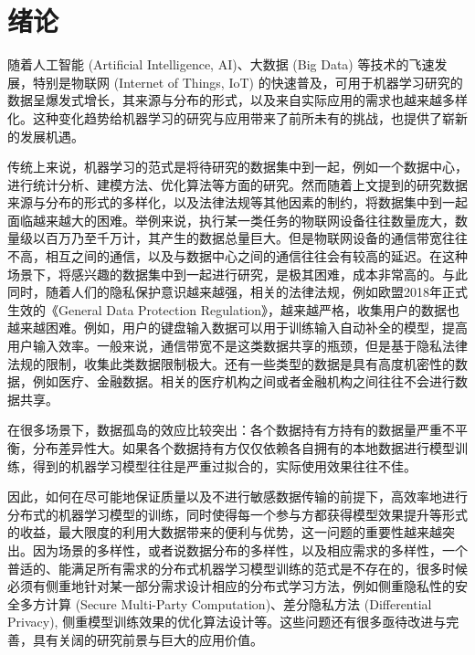 \section{绪论}
\label{sec:chap1-introduction}


随着人工智能 (Artificial Intelligence, AI)、大数据 (Big Data) 等技术的飞速发展，特别是物联网 (Internet of Things, IoT) 的快速普及，可用于机器学习研究的数据呈爆发式增长，其来源与分布的形式，以及来自实际应用的需求也越来越多样化。这种变化趋势给机器学习的研究与应用带来了前所未有的挑战，也提供了崭新的发展机遇。

传统上来说，机器学习的范式是将待研究的数据集中到一起，例如一个数据中心，进行统计分析、建模方法、优化算法等方面的研究。然而随着上文提到的研究数据来源与分布的形式的多样化，以及法律法规等其他因素的制约，将数据集中到一起面临越来越大的困难。举例来说，执行某一类任务的物联网设备往往数量庞大，数量级以百万乃至千万计，其产生的数据总量巨大。但是物联网设备的通信带宽往往不高，相互之间的通信，以及与数据中心之间的通信往往会有较高的延迟。在这种场景下，将感兴趣的数据集中到一起进行研究，是极其困难，成本非常高的。与此同时，随着人们的隐私保护意识越来越强，相关的法律法规，例如欧盟2018年正式生效的《General Data Protection Regulation》，越来越严格，收集用户的数据也越来越困难\citep{Albrecht_2016_GDPR}。例如，用户的键盘输入数据可以用于训练输入自动补全的模型，提高用户输入效率\citep{fl_keyboard}。一般来说，通信带宽不是这类数据共享的瓶颈，但是基于隐私法律法规的限制，收集此类数据限制极大。还有一些类型的数据是具有高度机密性的数据，例如医疗、金融数据。相关的医疗机构之间或者金融机构之间往往不会进行数据共享。

在很多场景下，数据孤岛的效应比较突出：各个数据持有方持有的数据量严重不平衡，分布差异性大。如果各个数据持有方仅仅依赖各自拥有的本地数据进行模型训练，得到的机器学习模型往往是严重过拟合的，实际使用效果往往不佳。

因此，如何在尽可能地保证质量以及不进行敏感数据传输的前提下，高效率地进行分布式的机器学习模型的训练，同时使得每一个参与方都获得模型效果提升等形式的收益，最大限度的利用大数据带来的便利与优势，这一问题的重要性越来越突出。因为场景的多样性，或者说数据分布的多样性，以及相应需求的多样性，一个普适的、能满足所有需求的分布式机器学习模型训练的范式是不存在的，很多时候必须有侧重地针对某一部分需求设计相应的分布式学习方法，例如侧重隐私性的安全多方计算 (Secure Multi-Party Computation)\cite{Bogetoft_2009_smpc}、差分隐私方法 (Differential Privacy)\citep{Dwork_2008_DP}, 侧重模型训练效果的优化算法设计\citep{boyd2011distributed}等。这些问题还有很多亟待改进与完善，具有关阔的研究前景与巨大的应用价值。
